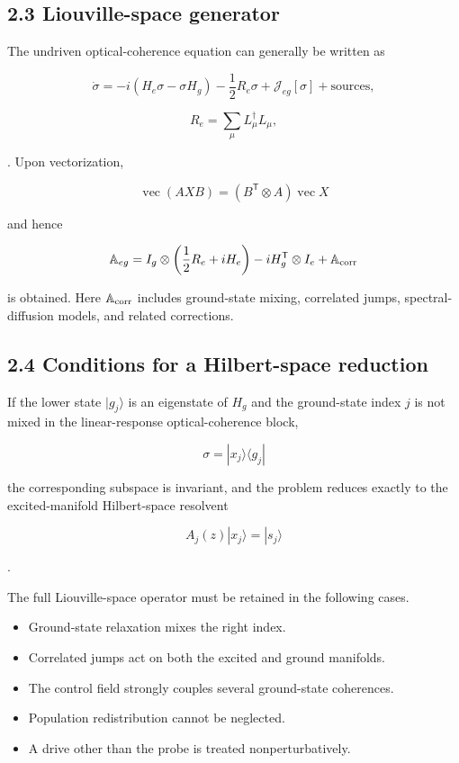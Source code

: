\documentclass[
  10pt,
  a4paper,
]{article}
\providecommand{\tightlist}{%
  \setlength{\itemsep}{0pt}\setlength{\parskip}{0pt}}
\begin{document}
\subsection{2.3 Liouville-space
generator}\label{liouville-space-generator}

The undriven optical-coherence equation can generally be written as

\[
\dot\sigma
=-i(H_e\sigma-\sigma H_g)
-\frac12R_e\sigma
+\mathcal J_{eg}[\sigma]
+\text{sources},
\]

\[
R_e=\sum_\mu L_\mu^\dagger L_\mu,
\]

. Upon vectorization,

\[
\operatorname{vec}(AXB)=(B^{\mathsf T}\otimes A)\operatorname{vec}X
\]

and hence

\[
\mathbb A_{eg}
=I_g\otimes\left(\frac12R_e+iH_e\right)
-iH_g^{\mathsf T}\otimes I_e
+\mathbb A_{\rm corr}
\]

is obtained. Here \(\mathbb A_{\rm corr}\) includes ground-state mixing,
correlated jumps, spectral-diffusion models, and related corrections.

\subsection{2.4 Conditions for a Hilbert-space
reduction}\label{conditions-for-a-hilbert-space-reduction}

If the lower state \(|g_j\rangle\) is an eigenstate of \(H_g\) and the
ground-state index \(j\) is not mixed in the linear-response
optical-coherence block,

\[
\sigma=|x_j\rangle\langle g_j|
\]

the corresponding subspace is invariant, and the problem reduces exactly
to the excited-manifold Hilbert-space resolvent

\[
A_j(z)|x_j\rangle=|s_j\rangle
\]

.

The full Liouville-space operator must be retained in the following
cases.

\begin{itemize}
\tightlist
\item
  Ground-state relaxation mixes the right index.
\item
  Correlated jumps act on both the excited and ground manifolds.
\item
  The control field strongly couples several ground-state coherences.
\item
  Population redistribution cannot be neglected.
\item
  A drive other than the probe is treated nonperturbatively.
\end{itemize}
\end{document}
